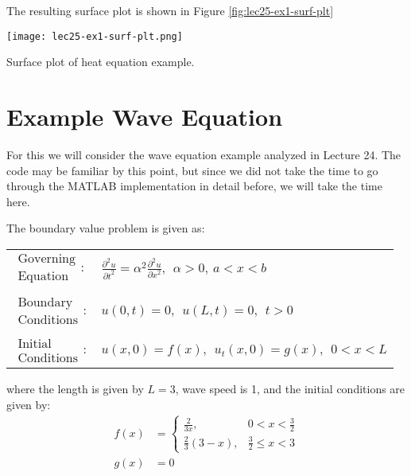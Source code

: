 \vspace{0.2cm}

\noindent The resulting surface plot is shown in Figure \ref{fig:lec25-ex1-surf-plt}

\begin{marginfigure}
\texttt{[image: lec25-ex1-surf-plt.png]}
\caption{Surface plot of heat equation example.}
\label{fig:lec25-ex1-surf-plt}
\end{marginfigure}

\section{Example Wave Equation}

For this we will consider the wave equation example analyzed in Lecture 24.  The code may be familiar by this point, but since we did not take the time to go through the MATLAB implementation in detail before, we will take the time here.

\vspace{3.0cm}

\noindent The boundary value problem is given as:
\begin{table}
\begin{tabular}{l l}
$\substack{\text{Governing} \\\text{Equation}}: $& $\frac{\partial^2 u}{\partial t^2} = \alpha^2 \frac{\partial^2 u}{\partial x^2}, \ \ \alpha > 0, \ a<x<b$  \\
& \\
$\substack{\text{Boundary} \\ \text{Conditions}}: $& $u(0,t)=0, \ \ u(L,t) = 0, \ \ t>0$\\
& \\
$\substack{\text{Initial} \\ \text{Conditions}}: $ & $u(x,0) = f(x), \ \ u_{t}(x,0) = g(x), \ \ 0<x<L $ \\
\end{tabular}
\end{table}
where the length is given by $L=3$, wave speed is 1, and the initial conditions are given by:
\begin{align*}
f(x) &= \begin{cases} \frac{2}{3x}, & 0 < x < \frac{3}{2} \\ \frac{2}{3}(3-x), & \frac{3}{2} \le x < 3 \end{cases} \\
g(x) &= 0
\end{align*}

